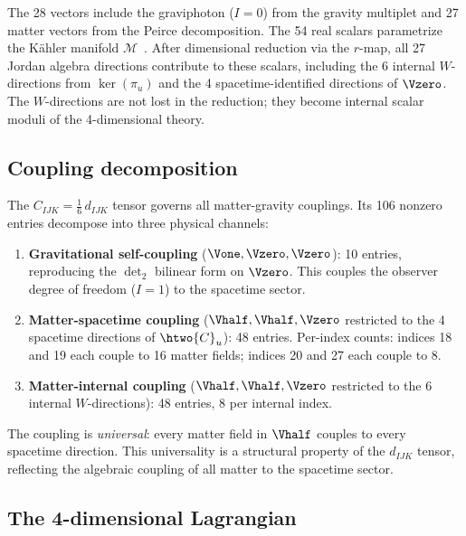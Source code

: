 The 28 vectors include the graviphoton ($I = 0$) from the gravity
multiplet and 27 matter vectors from the Peirce decomposition.
The 54 real scalars parametrize the K\"ahler manifold
$\mathcal{M}$~\cite{FerraraGunaydin2006}. After dimensional reduction
via the $r$-map, all 27 Jordan algebra directions contribute to these
scalars, including the 6 internal $W$-directions from
$\ker(\pi_u)$ and the 4 spacetime-identified directions of $\Vzero$.
The $W$-directions are not lost in the reduction; they become internal
scalar moduli of the 4-dimensional theory.

\subsection{Coupling decomposition}

The $C_{IJK} = \frac{1}{6}\,d_{IJK}$ tensor governs all
matter-gravity couplings. Its 106 nonzero entries decompose into three
physical channels:

\begin{enumerate}
\item \textbf{Gravitational self-coupling} ($\Vone, \Vzero, \Vzero$):
  10 entries, reproducing the $\det_2$ bilinear form on $\Vzero$. This
  couples the observer degree of freedom ($I = 1$) to the spacetime
  sector.

\item \textbf{Matter-spacetime coupling} ($\Vhalf, \Vhalf, \Vzero$
  restricted to the 4 spacetime directions of $\htwo{C}_u$): 48 entries.
  Per-index counts: indices 18 and 19 each couple to 16 matter fields;
  indices 20 and 27 each couple to 8.

\item \textbf{Matter-internal coupling} ($\Vhalf, \Vhalf, \Vzero$
  restricted to the 6 internal $W$-directions): 48 entries, 8 per
  internal index.
\end{enumerate}

The coupling is \emph{universal}: every matter field in $\Vhalf$ couples
to every spacetime direction. This universality is a structural property
of the $d_{IJK}$ tensor, reflecting the algebraic coupling of all matter
to the spacetime sector.

\subsection{The 4-dimensional Lagrangian}

